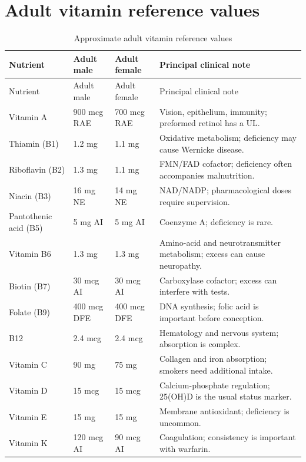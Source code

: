 \section{Adult vitamin reference values}
\small
\begin{longtable}{p{}p{}p{}p{}}
\caption{Approximate adult vitamin reference values}\\
\toprule
Nutrient & Adult male & Adult female & Principal clinical note \\
\midrule
\endfirsthead
\toprule Nutrient & Adult male & Adult female & Principal clinical note \\
\midrule
\endhead
Vitamin A & 900 mcg RAE & 700 mcg RAE & Vision, epithelium, immunity; preformed retinol has a UL.\\
Thiamin (B1) & 1.2 mg & 1.1 mg & Oxidative metabolism; deficiency may cause Wernicke disease.\\
Riboflavin (B2) & 1.3 mg & 1.1 mg & FMN/FAD cofactor; deficiency often accompanies malnutrition.\\
Niacin (B3) & 16 mg NE & 14 mg NE & NAD/NADP; pharmacological doses require supervision.\\
Pantothenic acid (B5) & 5 mg AI & 5 mg AI & Coenzyme A; deficiency is rare.\\
Vitamin B6 & 1.3 mg & 1.3 mg & Amino-acid and neurotransmitter metabolism; excess can cause neuropathy.\\
Biotin (B7) & 30 mcg AI & 30 mcg AI & Carboxylase cofactor; excess can interfere with tests.\\
Folate (B9) & 400 mcg DFE & 400 mcg DFE & DNA synthesis; folic acid is important before conception.\\
B12 & 2.4 mcg & 2.4 mcg & Hematology and nervous system; absorption is complex.\\
Vitamin C & 90 mg & 75 mg & Collagen and iron absorption; smokers need additional intake.\\
Vitamin D & 15 mcg & 15 mcg & Calcium-phosphate regulation; 25(OH)D is the usual status marker.\\
Vitamin E & 15 mg & 15 mg & Membrane antioxidant; deficiency is uncommon.\\
Vitamin K & 120 mcg AI & 90 mcg AI & Coagulation; consistency is important with warfarin.\\
\bottomrule
\end{longtable}
\normalsize

